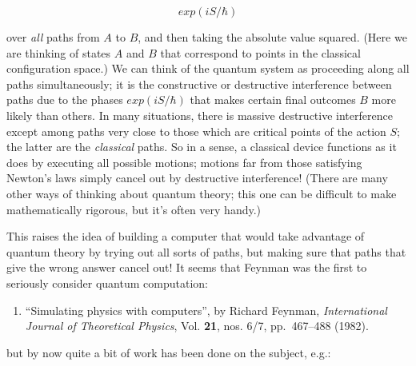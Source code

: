 \documentclass{article}
\def\tightlist{}
\begin{document}
\[exp(iS/\hbar)\]

over \emph{all} paths from \(A\) to \(B\), and then taking the absolute
value squared. (Here we are thinking of states \(A\) and \(B\) that
correspond to points in the classical configuration space.) We can think
of the quantum system as proceeding along all paths simultaneously; it
is the constructive or destructive interference between paths due to the
phases \(exp(iS/\hbar)\) that makes certain final outcomes \(B\) more
likely than others. In many situations, there is massive destructive
interference except among paths very close to those which are critical
points of the action \(S\); the latter are the \emph{classical} paths.
So in a sense, a classical device functions as it does by executing all
possible motions; motions far from those satisfying Newton's laws simply
cancel out by destructive interference! (There are many other ways of
thinking about quantum theory; this one can be difficult to make
mathematically rigorous, but it's often very handy.)

This raises the idea of building a computer that would take advantage of
quantum theory by trying out all sorts of paths, but making sure that
paths that give the wrong answer cancel out! It seems that Feynman was
the first to seriously consider quantum computation:

\begin{enumerate}
\def\labelenumi{\arabic{enumi})}
\setcounter{enumi}{1}
\tightlist
\item
  ``Simulating physics with computers'', by Richard Feynman,
  \emph{International Journal of Theoretical Physics}, Vol. \textbf{21},
  nos. 6/7, pp.~467--488 (1982).
\end{enumerate}

but by now quite a bit of work has been done on the subject, e.g.:
\end{document}
